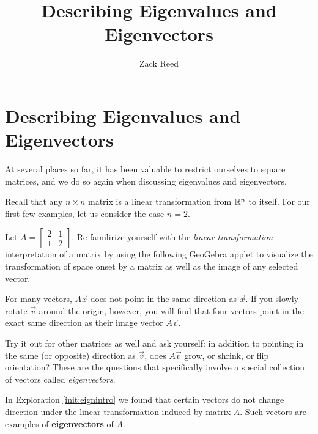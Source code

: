 \documentclass{ximera}
\author{Zack Reed}
\title{Describing Eigenvalues and Eigenvectors}
\begin{document}
\begin{abstract}

\end{abstract}
\maketitle


\section*{Describing Eigenvalues and Eigenvectors}

    
At several places so far, it has been valuable to restrict ourselves to square matrices, and we do so again when discussing eigenvalues and eigenvectors. 
    
Recall that any $n \times n$  matrix is a linear transformation from $\mathbb{R}^n$ to itself.  For our first few examples, let us consider the case $n = 2$.
    
\begin{exploration}\label{init:eignintro}
Let $A=\begin{bmatrix} 2& 1\\ 1&2
\end{bmatrix}$. Re-familirize yourself with the \emph{linear transformation} interpretation of a matrix by using the following GeoGebra applet to visualize the transformation of space onset by a matrix as well as the image of any selected vector. 

\begin{center}
\end{center}
    
    For many vectors, $A\vec{x}$ does not point in the same direction as $\vec{x}$. If you slowly rotate $\vec{v}$ around the origin, however, you will find that four vectors point in the exact same direction as their image vector $A\vec{v}$.

    Try it out for other matrices as well and ask yourself: in addition to pointing in the same (or opposite) direction as $\vec{v}$, does $A\vec{v}$ grow, or shrink, or flip orientation? These are the questions that specifically involve a special collection of vectors called \emph{eigenvectors}.
    

\end{exploration}
    
In Exploration \ref{init:eignintro} we found that certain vectors do not change direction under the linear transformation induced by matrix $A$.  Such vectors are examples of \textbf{eigenvectors} of $A$.
    
\end{document}
